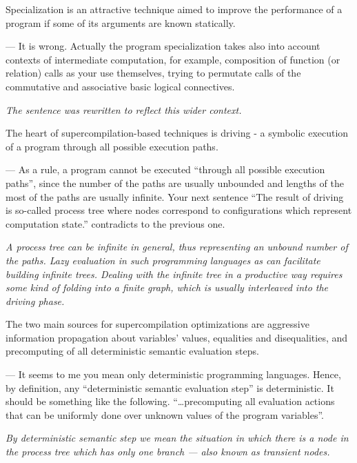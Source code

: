 \begin{enumerate}
  \setcounter{enumi}{6}
  \item {Specialization is an attractive technique aimed to improve the performance of a program if some of its arguments are known statically.

  --- It is wrong. Actually the program specialization takes also into account contexts of intermediate computation, for example, composition of function (or relation) calls as your use themselves, trying to permutate calls of the commutative and associative basic logical connectives.

  \emph{The sentence was rewritten to reflect this wider context.}
  }

  \item{
    The heart of supercompilation-based techniques is driving - a symbolic execution of a program through all possible execution paths.

    --- As a rule, a program cannot be executed ``through all possible execution paths'', since the number of the paths are usually unbounded and lengths of the most of the paths are usually infinite. Your next sentence ``The result of driving is so-called process tree where nodes correspond to configurations which represent computation state.'' contradicts to the previous one.

    \emph{A process tree can be infinite in general, thus representing an unbound number of the paths. Lazy evaluation in such programming languages as \haskell can facilitate building infinite trees. Dealing with the infinite tree in a productive way requires some kind of folding into a finite graph, which is usually interleaved into the driving phase.}

    \item {
      The two main sources for supercompilation optimizations are aggressive information propagation about variables' values, equalities and disequalities, and precomputing of all deterministic semantic evaluation steps.

      --- It seems to me you mean only deterministic programming languages. Hence, by definition, any ``deterministic semantic evaluation step'' is deterministic. It should be something like the following. ``\dots precomputing all evaluation actions that can be uniformly done over unknown values of the program variables''.

      \emph{By deterministic semantic step we mean the situation in which there is a node in the process tree which has only one branch --- also known as transient nodes.}
    }

}
\end{enumerate}
